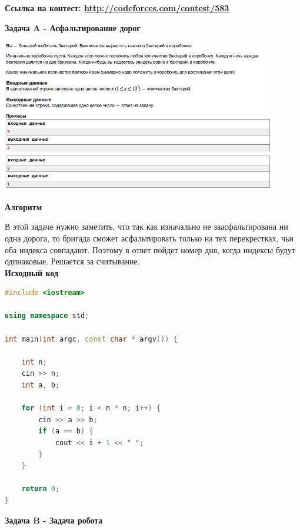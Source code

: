 \documentclass[a4paper,12pt]{article}
\begin{document}
\textbf{{\large Ссылка на контест: \url{http://codeforces.com/contest/583}}}

\newpage
\textbf{{\large Задача A - Асфальтирование дорог}}

\begin{center}
\includegraphics[width=0.9\textwidth]{C_320/A.png}\\ [1cm]
\end{center}

\textbf{{\large Алгоритм}}

В этой задаче нужно заметить, что так как изначально не заасфальтирована ни одна дорога, то бригада сможет асфальтировать только на тех перекрестках, чьи оба индекса совпадают. Поэтому в ответ пойдет номер дня, когда индексы будут одинаковые. Решается за считывание.\\

\textbf{{\large Исходный код}} \\
\begin{lstlisting}[language=C++]
#include <iostream>

using namespace std;

int main(int argc, const char * argv[]) {
    
    int n;
    cin >> n;
    int a, b;
    
    for (int i = 0; i < n * n; i++) {
        cin >> a >> b;
        if (a == b) {
            cout << i + 1 << " ";
        }
    }
    
    return 0;
}
\end{lstlisting}

\newpage
\textbf{{\large Задача B - Задача робота}}
\end{document}
